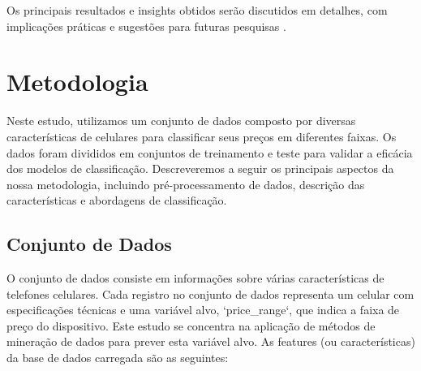 \documentclass[conference]{IEEEtran}
\begin{document}
Os principais resultados e insights obtidos serão discutidos em detalhes, 
com implicações práticas e sugestões para futuras pesquisas \cite{Jurafsky2020}.

\section{Metodologia}

Neste estudo, utilizamos um conjunto de dados composto por diversas características 
de celulares para classificar seus preços em diferentes faixas. 
Os dados foram divididos em conjuntos de treinamento e teste para validar a 
eficácia dos modelos de classificação. 
Descreveremos a seguir os principais aspectos da nossa metodologia, 
incluindo pré-processamento de dados, 
descrição das características 
e abordagens de classificação.

\subsection{Conjunto de Dados}

O conjunto de dados consiste em informações sobre várias características de telefones celulares. 
Cada registro no conjunto de dados representa um celular com especificações técnicas 
e uma variável alvo, `price\_range`, que indica a faixa de preço do dispositivo. 
Este estudo se concentra na aplicação de métodos de mineração de dados para prever 
esta variável alvo. As features (ou características) da 
base de dados carregada são as seguintes:
\end{document}
